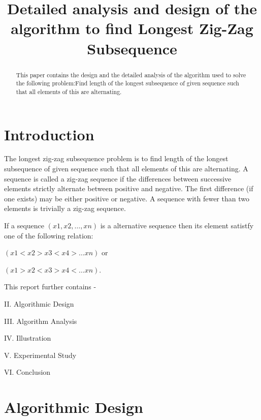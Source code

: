 \documentclass[conference]{IEEEtran}
\begin{document}
\title{Detailed analysis and design of the algorithm to find Longest Zig-Zag Subsequence\\

}

\author{
\and
{}
\and
{}
}

\maketitle

\begin{abstract}
This paper contains the design and the detailed analysis of the algorithm used to solve the following problem:Find length of the longest
subsequence of given sequence such that all elements of this are
alternating.
\end{abstract}
\section{Introduction}


The longest zig-zag subsequence problem is to find length of the longest
subsequence of given sequence such that all elements of this are
alternating. A sequence is called a zig-zag sequence if the differences between successive elements strictly alternate between positive and negative. The first difference (if one exists) may be either positive or negative. A sequence with fewer than two elements is trivially a zig-zag sequence.

If a sequence $(x1,x2,\dots,xn)$ is a alternative sequence then its element satistfy one of the following relation:

$(x1<x2>x3<x4>\dots xn)$ or

$(x1>x2<x3>x4<\dots xn)$.

This report further contains -

II. Algorithmic Design

III. Algorithm Analysis

IV. Illustration

V. Experimental Study

VI. Conclusion 

\section{Algorithmic Design}
\end{document}
